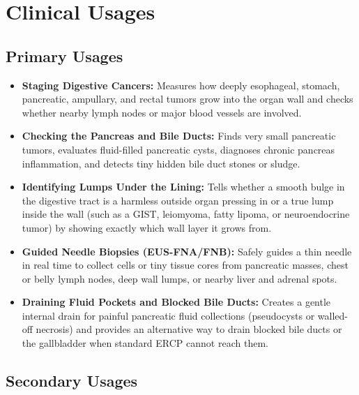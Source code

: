 \section{Clinical Usages}

\subsection{Primary Usages}

\begin{itemize}
    \item \textbf{Staging Digestive Cancers:} Measures how deeply esophageal, stomach, pancreatic, ampullary, and rectal tumors grow into the organ wall and checks whether nearby lymph nodes or major blood vessels are involved.
    \item \textbf{Checking the Pancreas and Bile Ducts:} Finds very small pancreatic tumors, evaluates fluid-filled pancreatic cysts, diagnoses chronic pancreas inflammation, and detects tiny hidden bile duct stones or sludge.
    \item \textbf{Identifying Lumps Under the Lining:} Tells whether a smooth bulge in the digestive tract is a harmless outside organ pressing in or a true lump inside the wall (such as a GIST, leiomyoma, fatty lipoma, or neuroendocrine tumor) by showing exactly which wall layer it grows from.
    \item \textbf{Guided Needle Biopsies (EUS-FNA/FNB):} Safely guides a thin needle in real time to collect cells or tiny tissue cores from pancreatic masses, chest or belly lymph nodes, deep wall lumps, or nearby liver and adrenal spots.
    \item \textbf{Draining Fluid Pockets and Blocked Bile Ducts:} Creates a gentle internal drain for painful pancreatic fluid collections (pseudocysts or walled-off necrosis) and provides an alternative way to drain blocked bile ducts or the gallbladder when standard ERCP cannot reach them.
\end{itemize}

\subsection{Secondary Usages}

